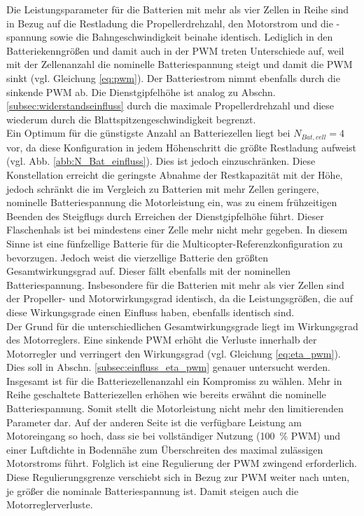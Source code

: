 Die Leistungsparameter für die Batterien mit mehr als vier Zellen in Reihe sind in Bezug auf die Restladung die Propellerdrehzahl, den Motorstrom und die -spannung sowie die Bahngeschwindigkeit beinahe identisch. Lediglich in den Batteriekenngrößen und damit auch in der PWM treten Unterschiede auf, weil mit der Zellenanzahl die nominelle Batteriespannung steigt und damit die PWM sinkt (vgl. Gleichung \eqref{eq:pwm}). Der Batteriestrom nimmt ebenfalls durch die sinkende PWM ab. Die Dienstgipfelhöhe ist analog zu Abschn. \ref{subsec:widerstandseinfluss} durch die maximale Propellerdrehzahl und diese wiederum durch die Blattspitzengeschwindigkeit begrenzt. \\
Ein Optimum für die günstigste Anzahl an Batteriezellen liegt bei \ensuremath{N_{Bat,cell} = 4} vor, da diese Konfiguration in jedem Höhenschritt die größte Restladung aufweist (vgl. Abb. \ref{abb:N_Bat_einfluss}). Dies ist jedoch einzuschränken. Diese Konstellation erreicht die geringste Abnahme der Restkapazität mit der Höhe, jedoch schränkt die im Vergleich zu Batterien mit mehr Zellen geringere, nominelle Batteriespannung die Motorleistung ein, was zu einem frühzeitigen Beenden des Steigflugs durch Erreichen der Dienstgipfelhöhe führt. Dieser Flaschenhals ist bei mindestens einer Zelle mehr nicht mehr gegeben. In diesem Sinne ist eine fünfzellige Batterie für die Multicopter-Referenzkonfiguration zu bevorzugen. Jedoch weist die vierzellige Batterie den größten Gesamtwirkungsgrad auf. Dieser fällt ebenfalls mit der nominellen Batteriespannung. Insbesondere für die Batterien mit mehr als vier Zellen sind der Propeller- und Motorwirkungsgrad identisch, da die Leistungsgrößen, die auf diese Wirkungsgrade einen Einfluss haben, ebenfalls identisch sind. \\
Der Grund für die unterschiedlichen Gesamtwirkungsgrade liegt im Wirkungsgrad des Motorreglers. Eine sinkende PWM erhöht die Verluste innerhalb der Motorregler und verringert den Wirkungsgrad (vgl. Gleichung \eqref{eq:eta_pwm}). Dies soll in Abschn. \ref{subsec:einfluss_eta_pwm} genauer untersucht werden.\\
Insgesamt ist für die Batteriezellenanzahl ein Kompromiss zu wählen. 
Mehr in Reihe geschaltete Batteriezellen erhöhen wie bereits erwähnt die nominelle Batteriespannung. Somit stellt die Motorleistung nicht mehr den limitierenden Parameter dar. Auf der anderen Seite ist die verfügbare Leistung am Motoreingang so hoch, dass sie bei vollständiger Nutzung (\SI{100}{\%} PWM) und einer Luftdichte in Bodennähe zum Überschreiten des maximal zulässigen Motorstroms führt. Folglich ist eine Regulierung der PWM zwingend erforderlich. Diese Regulierungsgrenze verschiebt sich in Bezug zur PWM weiter nach unten, je größer die nominale Batteriespannung ist. Damit steigen auch die Motorreglerverluste.


